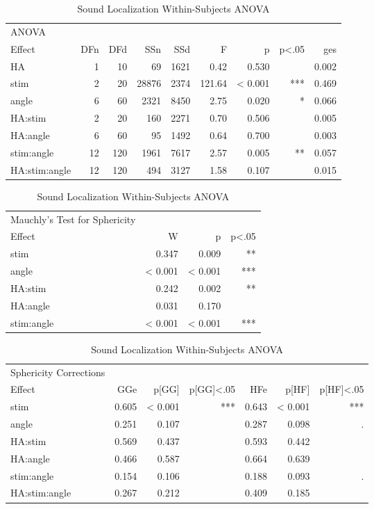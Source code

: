 \begin{table}[htp]
\begin{tabular}{lrrrrrrrr}
\hline
ANOVA & & & & & & & & \\
         Effect & DFn & DFd  &    SSn &  SSd   &     F   &  p & p<.05  &  ges \\
            HA &  1 & 10  &  69 & 1621 &  0.42 & 0.530    &   & 0.002 \\
          stim &  2 & 20 & 28876 & 2374 & 121.64 & < 0.001  &  *** & 0.469 \\
         angle &  6 & 60 & 2321 & 8450 &  2.75 & 0.020   &  * & 0.066 \\
       HA:stim &  2 & 20 &  160 & 2271 &  0.70 & 0.506  &    & 0.005 \\
      HA:angle &  6 & 60  &  95 & 1492 &  0.64 & 0.700   &    & 0.003 \\
    stim:angle & 12 & 120 & 1961 & 7617 &  2.57 & 0.005  &   ** & 0.057 \\
 HA:stim:angle & 12 & 120 &  494 & 3127 &  1.58 & 0.107  &     & 0.015 \\
\hline
\end{tabular}
\begin{tabular}{lrrr}
Mauchly's Test for Sphericity & & & \\
      Effect  &      W   &     p & p<.05 \\
       stim & 0.347 & 0.009 &     ** \\
      angle & < 0.001 & < 0.001 &     *** \\
    HA:stim & 0.242 & 0.002 &     ** \\
   HA:angle & 0.031 & 0.170 &       \\
 stim:angle & < 0.001 & < 0.001 &     *** \\
\hline
\end{tabular}
\begin{tabular}{lrrrrrr}
Sphericity Corrections & & & & & & \\
         Effect &  GGe &   p[GG] & p[GG]<.05 &   HFe  &   p[HF] & p[HF]<.05 \\
          stim & 0.605 & < 0.001 &         *** & 0.643 & < 0.001 &  *** \\
         angle & 0.251 & 0.107 &           & 0.287 & 0.098 &  . \\
       HA:stim & 0.569 & 0.437 &           & 0.593 & 0.442 &    \\
      HA:angle & 0.466 & 0.587 &           & 0.664 & 0.639 &    \\
    stim:angle & 0.154 & 0.106 &           & 0.188 & 0.093 &  .  \\
 HA:stim:angle & 0.267 & 0.212 &           & 0.409 & 0.185 &    \\
\hline
\end{tabular}
\caption{Sound Localization Within-Subjects ANOVA}
\end{table}

